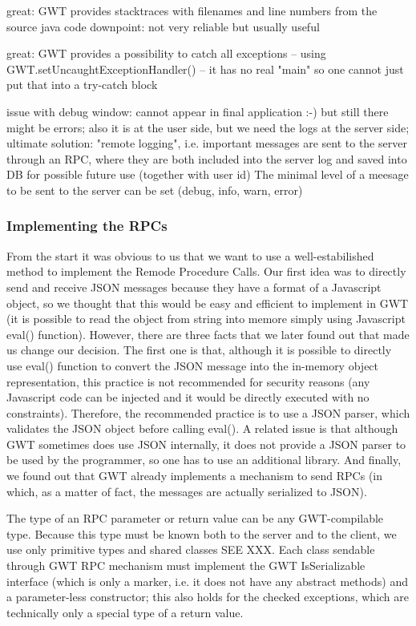 great: GWT provides stacktraces with filenames and line numbers from the source java code
downpoint: not very reliable but usually useful

great: GWT provides a possibility to catch all exceptions -- using GWT.setUncaughtExceptionHandler() -- it has no real "main" so one cannot just put that into a try-catch block

issue with debug window: cannot appear in final application :-) but still there might be errors;
also it is at the user side, but we need the logs at the server side;
ultimate solution: "remote logging", i.e. important messages are sent to the server through an RPC, where they are both included into the server log and saved into DB for possible future use (together with user id)
The minimal level of a meesage to be sent to the server can be set (debug, info, warn, error)

\subsubsection{Implementing the RPCs}

From the start it was obvious to us that we want to use a well-estabilished method to implement the Remode Procedure Calls. Our first idea was to directly send and receive JSON messages because they have a format of a Javascript object, so we thought that this would be easy and efficient to implement in GWT (it is possible to read the object from string into memore simply using Javascript eval() function). However, there are three facts that we later found out that made us change our decision. The first one is that, although it is possible to directly use eval() function to convert the JSON message into the in-memory object representation, this practice is not recommended for security reasons (any Javascript code can be injected and it would be directly executed with no constraints). Therefore, the recommended practice is to use a JSON parser, which validates the JSON object before calling eval(). A related issue is that although GWT sometimes does use JSON internally, it does not provide a JSON parser to be used by the programmer, so one has to use an additional library. And finally, we found out that GWT already implements a mechanism to send RPCs (in which, as a matter of fact, the messages are actually serialized to JSON).

The type of an RPC parameter or return value can be any GWT-compilable type. Because this type must be known both to the server and to the client, we use only primitive types and shared classes SEE XXX. Each class sendable through GWT RPC mechanism must implement the GWT IsSerializable interface (which is only a marker, i.e. it does not have any abstract methods) and a parameter-less constructor; this also holds for the checked exceptions, which are technically only a special type of a return value.


